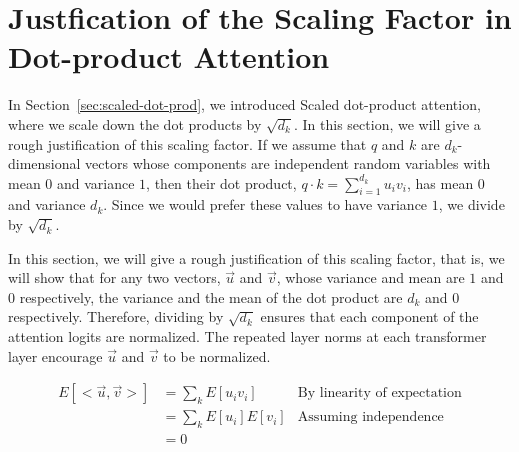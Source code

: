 \section*{Justfication of the Scaling Factor in Dot-product Attention}

In Section~\ref{sec:scaled-dot-prod}, we introduced Scaled dot-product
attention, where we scale down the dot products by $\sqrt{d_k}$.   In this
section, we will give a rough justification of this scaling factor.  If we
assume that $q$ and $k$ are $d_k$-dimensional vectors whose components are
independent random variables with mean $0$ and variance $1$, then their dot
product, $q \cdot k = \sum_{i=1}^{d_k} u_iv_i$, has mean $0$ and variance
$d_k$.	Since we would prefer these values to have variance $1$, we divide by
$\sqrt{d_k}$.


\iffalse

    In this section, we will give a rough justification of this scaling factor,
    that is, we will show that for any two vectors, $\vec{u}$ and $\vec{v}$, whose
    variance and mean are $1$ and $0$ respectively, the variance and the mean of
    the dot product are $d_k$ and $0$ respectively. Therefore, dividing by
    $\sqrt{d_k}$ ensures that each component of the attention logits are
    normalized. The repeated layer norms at each transformer layer encourage
    $\vec{u}$ and $\vec{v}$ to be normalized.

    \begin{align*}
        E[<\vec{u},\vec{v}>] & =  \sum_k E[u_i v_i] & \text{By linearity of
        expectation}                                                               \\
                             & =\sum_k E[u_i]E[v_i] & \text{Assuming independence} \\
                             & = 0
    \end{align*}

